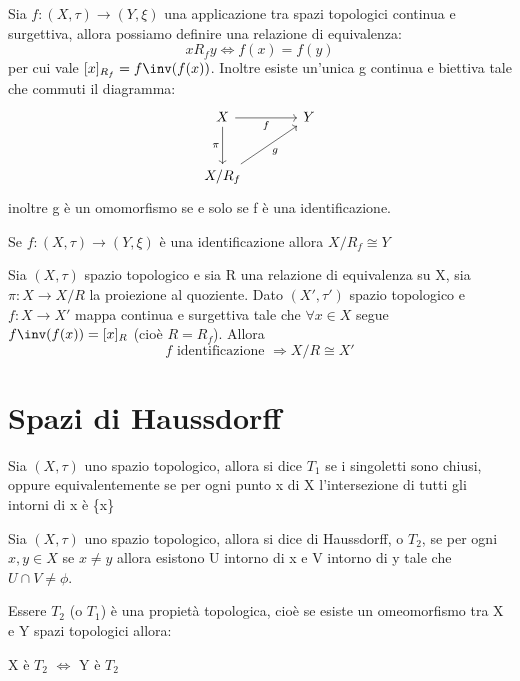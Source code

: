 \documentclass[a4paper]{article}
\begin{document}
\begin{teo}
\label{quoziente:omomorfismo}
	Sia $f : (X,\tau) \to (Y,\xi)$ una applicazione tra spazi topologici continua e surgettiva, allora possiamo definire una relazione di equivalenza: 
	\[
		x R_f y \Longleftrightarrow f(x) = f(y)
	\]
	per cui vale $ [x]_{R_f} = f\inv (f(x))$. Inoltre esiste un'unica g continua e biettiva tale che commuti il diagramma: 
	\[
	\begin{tikzcd}[column sep=large, row sep=large]
	X \ar[d, "\pi"'] \ar[r, "f"'] & Y  \\
	X/R_f \ar[ru, "g"'] 
	\end{tikzcd}
	\] 
	inoltre g è un omomorfismo se e solo se f è una identificazione.
\end{teo}

\begin{cor}
	Se $f : (X,\tau) \to (Y,\xi)$ è una identificazione allora $X/R_f \cong Y $
\end{cor}

\begin{cor}
	Sia $(X,\tau )$ spazio topologico e sia R una relazione di equivalenza su X, sia $\pi : X \to X/R $ la proiezione al quoziente. Dato $(X',\tau')$ spazio topologico e $f:X \to X' $ mappa continua e surgettiva tale che $\forall x \in X$ segue $f\inv (f(x)) = [x]_R $ (cioè $R=R_f$). Allora 
	\[ f \text{ identificazione } \Rightarrow X/R \cong X'\]
\end{cor}

\section{Spazi di Haussdorff}

\begin{deff}
	Sia $(X,\tau )$ uno spazio topologico, allora si dice $T_1$ se i singoletti sono chiusi, oppure equivalentemente se per ogni punto x di X l'intersezione di tutti gli intorni di x è \{x\}
\end{deff}
\begin{deff}
	Sia $(X,\tau )$ uno spazio topologico, allora si dice di Haussdorff, o $T_2$, se per ogni $x,y \in X$ se $x\neq y$ allora esistono U intorno di x e V intorno di y tale che $U \cap V \neq \phi $.
\end{deff}

\begin{oss}
	Essere $ T_2 $ (o $T_1$) è una propietà topologica, cioè se esiste un omeomorfismo tra X e Y spazi topologici allora: 
	\begin{center}
		X è $T_2$ $\Longleftrightarrow $ Y è $T_2$
	\end{center}
\end{oss}
\end{document}
